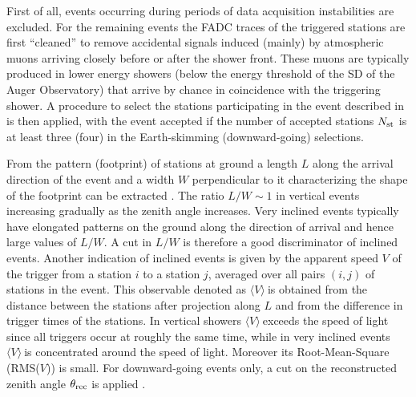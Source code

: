 \documentclass[reprint,showpacs,showkeys,amsmath,amssymb,aps,nofootinbib]{revtex4-1}
\def \vavrg {$\langle V \rangle ~$}
\begin{document}
First of all, events occurring during periods of data acquisition instabilities
\cite{Auger_trigger} are excluded.
For the remaining events the FADC traces of the triggered stations are first
``cleaned'' to remove accidental signals \cite{ES} induced (mainly) by atmospheric muons
arriving closely before or after the shower front.
These muons are typically produced in lower energy showers (below
the energy threshold of the SD of the Auger Observatory) that arrive by chance
in coincidence with the triggering shower. 
A procedure to select the stations participating in the event described
in \cite{ES,DGH} is then applied, with the event accepted if 
the number of accepted stations $N_{\rm st}$ is at least 
three (four) in the Earth-skimming (downward-going) selections.

From the pattern (footprint) of stations at ground
a length $L$ along the arrival direction
of the event and a width $W$ perpendicular to it
characterizing the shape of the footprint can be extracted \cite{ES}. 
The ratio $L/W\sim 1$ in vertical events increasing
gradually as the zenith angle increases.
Very inclined events typically have elongated patterns on the
ground along the direction of arrival and hence  
large values of $L/W$. 
A cut in $L/W$ is therefore a good discriminator of inclined events.
Another indication of inclined events is given by the apparent speed
$V$ of the trigger from a station $i$ to a station $j$, averaged over
all pairs $(i,j)$ of stations in the event. This observable denoted as \vavrg is obtained 
from the distance
between the stations after projection along $L$ 
and from the difference in trigger times of the stations. 
In vertical showers \vavrg exceeds the speed of light since 
all triggers occur at roughly the same time, while in very inclined events 
\vavrg is concentrated around the speed of light. 
Moreover its Root-Mean-Square (RMS($V$)) is small.
For downward-going events only, a cut on the reconstructed zenith angle 
$\theta_{\rm rec}$ is applied \cite{DGH}. 
\end{document}
